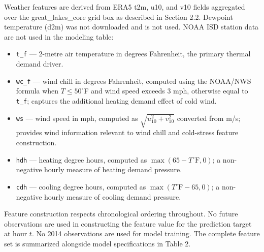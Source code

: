 \documentclass[12pt,a4paper]{article}
\begin{document}
Weather features are derived from ERA5 t2m, u10, and v10 fields aggregated over the great\_lakes\_core grid box as described in Section 2.2. Dewpoint temperature (d2m) was not downloaded and is not used. NOAA ISD station data are not used in the modeling table:

\begin{itemize}[leftmargin=*, itemsep=2pt]
    \item \texttt{t\_f} --- 2-metre air temperature in degrees Fahrenheit, the primary thermal demand driver.
    \item \texttt{wc\_f} --- wind chill in degrees Fahrenheit, computed using the NOAA/NWS formula when $T \leq 50^\circ$F and wind speed exceeds 3 mph, otherwise equal to \texttt{t\_f}; captures the additional heating demand effect of cold wind.
    \item \texttt{ws} --- wind speed in mph, computed as $\sqrt{u_{10}^2 + v_{10}^2}$ converted from m/s; provides wind information relevant to wind chill and cold-stress feature construction.
    \item \texttt{hdh} --- heating degree hours, computed as $\max(65 - T^\circ\mathrm{F}, 0)$; a non-negative hourly measure of heating demand pressure.
    \item \texttt{cdh} --- cooling degree hours, computed as $\max(T^\circ\mathrm{F} - 65, 0)$; a non-negative hourly measure of cooling demand pressure.
\end{itemize}


Feature construction respects chronological ordering throughout. No future observations are used in constructing the feature value for the prediction target at hour $t$. No 2014 observations are used for model training. The complete feature set is summarized alongside model specifications in Table 2.
\end{document}
